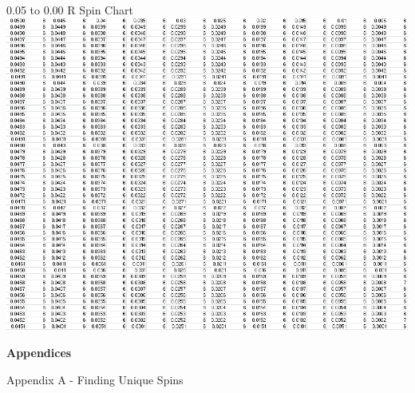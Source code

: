 \documentclass{article}
\begin{document}
\pagebreak
\begin{center}
\LARGE 0.05 to 0.00 R Spin Chart
 \includegraphics[keepaspectratio,scale=0.7]{005to000RSpinChart.png}
\end{center}
\pagebreak


\begin{center}
\LARGE\textbf{Appendices} \\
\end{center}
\Large
Appendix A - Finding Unique Spins
\large
\end{document}
